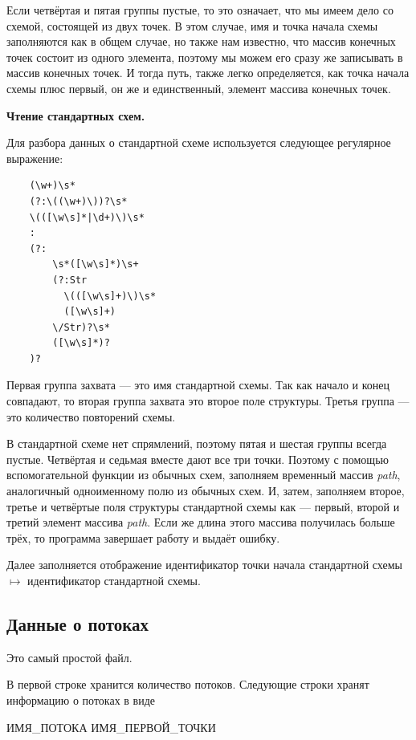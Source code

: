 \documentclass[12pt]{article}
\theoremstyle{plain}
\begin{document}
Если четвёртая и пятая группы пустые, то это означает, что мы имеем дело со схемой, состоящей из двух точек. В этом случае, имя и точка начала схемы заполняются как в общем случае, но также нам известно, что массив конечных точек состоит из одного элемента, поэтому мы можем его сразу же записывать в массив конечных точек. И тогда путь, также легко определяется, как точка начала схемы плюс первый, он же и единственный, элемент массива конечных точек.

\medskip

\noindent
\textbf{Чтение стандартных схем.}

Для разбора данных о стандартной схеме используется следующее регулярное выражение:
\begin{verbatim}
    (\w+)\s*
    (?:\((\w+)\))?\s*
    \(([\w\s]*|\d+)\)\s* 
    :
    (?:
        \s*([\w\s]*)\s+
        (?:Str
          \(([\w\s]+)\)\s*
          ([\w\s]+)
        \/Str)?\s*
        ([\w\s]*)?
    )?
\end{verbatim}

Первая группа захвата --- это имя стандартной схемы. Так как начало и конец совпадают, то вторая группа захвата это второе поле структуры. Третья группа --- это количество повторений схемы.

В стандартной схеме нет спрямлений, поэтому пятая и шестая группы всегда пустые. Четвёртая и седьмая вместе дают все три точки. Поэтому с помощью вспомогательной функции из обычных схем, заполняем временный массив \textit{path}, аналогичный одноименному полю из обычных схем. И, затем, заполняем второе, третье и четвёртые поля структуры стандартной схемы как --- первый, второй и третий элемент массива \textit{path}. Если же длина этого массива получилась больше трёх, то программа завершает работу и выдаёт ошибку.

Далее заполняется отображение идентификатор точки начала стандартной схемы $\mapsto$ идентификатор стандартной схемы.



\subsection{Данные о потоках}
\label{sec:flows}

Это самый простой файл.

В первой строке хранится количество потоков. Следующие строки хранят информацию о потоках в виде
\begin{center}
  ИМЯ\_ПОТОКА ИМЯ\_ПЕРВОЙ\_ТОЧКИ
\end{center}
\end{document}
